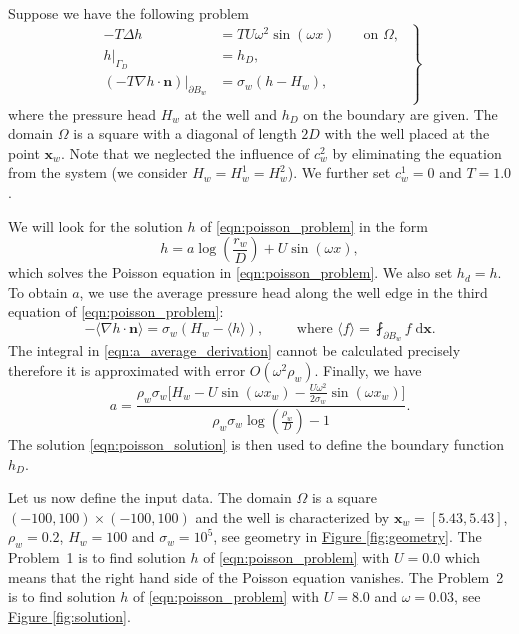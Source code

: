 \documentclass{elsarticle}
\newcommand{\prob}[1]{Problem~{#1}}
\newcommand{\fig}[1]{\hyperref[#1]{Figure \ref{#1}}}
\def\vc#1{\mathbf{\boldsymbol{#1}}}     %
\newcommand{\dd}{\; \mathrm{d}}
\newcommand{\bx}{\vc{x}}
\begin{document}
Suppose we have the following problem
\begin{equation} \label{eqn:poisson_problem}
\left.\begin{aligned}
    -T \Delta h &= TU\omega^2\sin(\omega x) \qquad \textrm{on } \Omega, \\
    h|_{\Gamma_D} &= h_D,\\
    \left(-T\nabla h\cdot\vc{n}\right)|_{\partial B_w} &= \sigma_w\left(h - H_w\right), \\
    \end{aligned}
    \;\right\}
\end{equation}
where the pressure head $H_w$ at the well and $h_D$ on the boundary are given. 
The domain $\Omega$ is a square with a diagonal of length $2D$ with the well placed at the point $\vc{x}_w$.
Note that we neglected the influence of $c^2_w$ by eliminating the equation from the system (we consider 
$H_w = H^1_w = H^2_w$). We further set $c^1_w=0$ and $T=1.0$. 

We will look for the solution $h$ of \eqref{eqn:poisson_problem} in the form
\begin{equation} \label{eqn:poisson_solution}
  h=a\log\left(\frac{r_w}{D}\right)+U\sin(\omega x),
\end{equation}
which solves the Poisson equation in \eqref{eqn:poisson_problem}. We also set $h_d=h$.
To obtain $a$, we use the average pressure head along the well edge in the third equation 
of \eqref{eqn:poisson_problem}:
\begin{equation} \label{eqn:a_average_derivation}
     -\langle\nabla h \cdot \vc{n}\rangle = \sigma_w\left(H_w - \langle{h}\rangle \right), 
    \qquad \textrm{ where } \langle{f}\rangle = \fint_{\partial B_w} f  \dd\bx.
\end{equation}
The integral in \eqref{eqn:a_average_derivation} cannot be calculated precisely therefore it is approximated with error 
$O(\omega^2 \rho_w)$. Finally, we have
\begin{equation} \label{eqn:a_constant}
    a=\frac{\rho_w \sigma_w \big[H_w - U\sin(\omega x_w) - \frac{U\omega^2}{2\sigma_w}\sin(\omega x_w)\big]}
           {\rho_w \sigma_w \log\left(\frac{\rho_w}{D}\right) - 1}.
\end{equation}
The solution \eqref{eqn:poisson_solution} is then used to define the boundary function $h_D$.


Let us now define the input data. The domain $\Omega$ is a square $(-100,100)\times(-100,100)$ and the well is characterized by 
$\vc{x}_w=[5.43,5.43]$,  $\rho_w=0.2$, $H_w=100$ and $\sigma_w=10^5$, see geometry in \fig{fig:geometry}. The \prob{1} is to find solution $h$ of
\eqref{eqn:poisson_problem} with $U=0.0$ which means that the right hand side of the Poisson equation vanishes.
The \prob{2} is to find solution $h$ of \eqref{eqn:poisson_problem} with $U=8.0$ and $\omega=0.03$, see \fig{fig:solution}.
\end{document}
